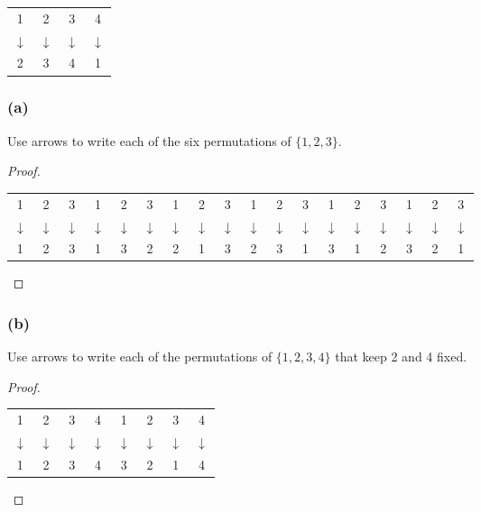 \documentclass[14pt]{extarticle}
\newcommand{\cyda}{{\cy \(\downarrow\)}}
\newcommand{\cy}{\color{cyan}}
\begin{document}
\begin{center}
     \begin{tabular}{cccc}
          1     & 2     & 3     & 4     \\
          \cyda & \cyda & \cyda & \cyda \\
          2     & 3     & 4     & 1     \\
     \end{tabular}
\end{center}

\subsubsection{(a)}
Use arrows to write each of the six permutations of \(\{1, 2, 3\}\).

\begin{proof}
     \begin{center}
          \begin{tabular}{ccc|ccc|ccc|ccc|ccc|ccc}
               1     & 2     & 3     & 1     & 2     & 3     & 1     & 2     & 3     & 1     & 2     & 3     & 1     & 2     & 3 & 1 & 2 & 3 \\
               \cyda & \cyda & \cyda & \cyda & \cyda & \cyda & \cyda & \cyda & \cyda & \cyda & \cyda & \cyda & \cyda & \cyda &
               \cyda & \cyda & \cyda & \cyda                                                                                                 \\
               1     & 2     & 3     & 1     & 3     & 2     & 2     & 1     & 3     & 2     & 3     & 1     & 3     & 1     & 2 & 3 & 2 & 1
          \end{tabular}
     \end{center}
\end{proof}

\subsubsection{(b)}
Use arrows to write each of the permutations of \(\{1, 2, 3, 4\}\) that keep 2 and 4 fixed.

\begin{proof}
     \begin{center}
          \begin{tabular}{cccc|cccc}
               1     & 2     & 3     & 4     & 1     & 2     & 3     & 4     \\
               \cyda & \cyda & \cyda & \cyda & \cyda & \cyda & \cyda & \cyda \\
               1     & 2     & 3     & 4     & 3     & 2     & 1     & 4
          \end{tabular}
     \end{center}
\end{proof}
\end{document}
